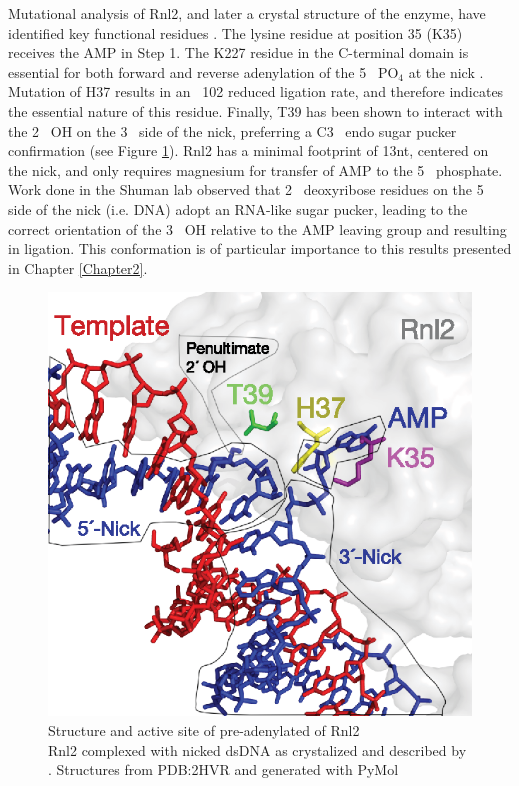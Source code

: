     Mutational analysis of Rnl2, and later a crystal structure of the enzyme, have identified key functional residues \citep{Ho2004, Nandakumar2006,Nandakumar2004a,Yin2003d}. The lysine residue at position 35 (K35) receives the AMP in Step 1. The K227 residue in the C-terminal domain is essential for both forward and reverse adenylation of the 5\textprime~ PO$_4$ at the nick \citep{Viollet2011}. Mutation of H37 results in an ~102 reduced ligation rate, and therefore indicates the essential nature of this residue. Finally, T39 has been shown to interact with the 2\textprime~ OH on the 3\textprime~ side of the nick, preferring a C3\textprime~ endo sugar pucker confirmation (see Figure \ref{fig:Rnl2 Active Site Residues}). Rnl2 has a minimal footprint of 13nt, centered on the nick, and only requires magnesium for transfer of AMP to the 5\textprime~ phosphate. Work done in the Shuman lab \citep{Nandakumar2006} observed that 2\textprime~ deoxyribose residues on the 5\textprime~ side of the nick (i.e. DNA) adopt an RNA-like sugar pucker, leading to the correct orientation of the 3\textprime~ OH relative to the AMP leaving group and resulting in ligation. This conformation is of particular importance to this results presented in Chapter \ref{Chapter2}.

    \begin{figure}[htbp] %
      \centering 
      \includegraphics{Figures/Chapter1/Rnl2_Active_Site_Residues.eps}
      \caption[Active site of T4 RNA Ligase 2 with highlighted residues]
      {
        Structure and active site of pre-adenylated of Rnl2\\[0.25cm]
        Rnl2 complexed with nicked dsDNA as crystalized and described by \citep{Nandakumar2006}. Structures from PDB:2HVR and generated with PyMol
        }
      \label{fig:Rnl2 Active Site Residues}
      \end{figure}

